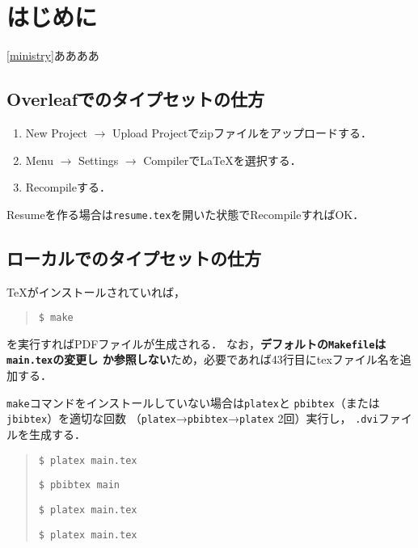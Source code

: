 
\chapter{はじめに}
\label{cha:intro}

\ref{ministry}ああああ

\section{Overleafでのタイプセットの仕方}

\begin{enumerate}
 \item New Project $\rightarrow$ Upload Projectでzipファイルをアップロードする．
 \item Menu $\rightarrow$ Settings $\rightarrow$ CompilerでLaTeXを選択する．
 \item Recompileする．
\end{enumerate}

Resumeを作る場合は\texttt{resume.tex}を開いた状態でRecompileすればOK．

\section{ローカルでのタイプセットの仕方}

TeXがインストールされていれば，
\begin{quote}
 \texttt{\$ make}
\end{quote}
を実行すればPDFファイルが生成される．
なお，\textbf{デフォルトの\texttt{Makefile}は\texttt{main.tex}の変更し
か参照しない}ため，必要であれば43行目にtexファイル名を追加する．

\texttt{make}コマンドをインストールしていない場合は\texttt{platex}と
\texttt{pbibtex}（または\texttt{jbibtex}）を適切な回数
（\texttt{platex}→\texttt{pbibtex}→\texttt{platex} 2回）実行し，
\texttt{.dvi}ファイルを生成する．
\begin{quote}
 \texttt{\$ platex main.tex}

 \texttt{\$ pbibtex main}

 \texttt{\$ platex main.tex}

 \texttt{\$ platex main.tex}
\end{quote}

